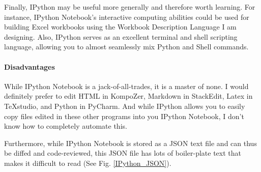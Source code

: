 \documentclass[12pt]{Report}
\begin{document}
		Finally, IPython may be useful more generally and therefore worth learning.  
		For instance, IPython Notebook's interactive computing abilities could be used for building Excel workbooks 
			using the Workbook Description Language I am designing.
		Also, IPython serves as an excellent terminal and shell scripting language, allowing you to almost seamlessly mix Python and Shell commands.
		
	\paragraph{Disadvantages}	
		While IPython Notebook is a jack-of-all-trades, it is a master of none.  
		I would definitely prefer to edit HTML in KompoZer, Markdown in StackEdit, Latex in TeXstudio, and Python in PyCharm.  
		And while IPython allows you to easily copy files edited in these other programs into you IPython Notebook, I don't know how to completely automate this.
		
		Furthermore, while IPython Notebook is stored as a JSON text file and can thus be diffed and code-reviewed, 
		this JSON file has lots of boiler-plate text that makes it difficult to read (See Fig. \ref{IPython_JSON}).
		
\end{document}
